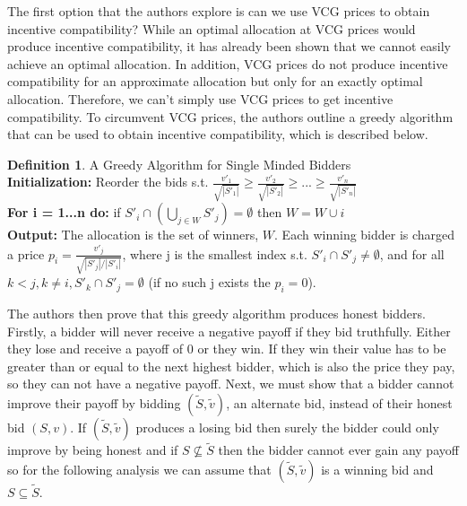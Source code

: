 \documentclass[10pt,onecolumn,letterpaper]{article}
\theoremstyle{definition}
\newtheorem{definition}{Definition}[section]
\begin{document}
The first option that the authors explore is can we use VCG prices to obtain incentive compatibility? While an optimal allocation at VCG prices would produce incentive compatibility, it has already been shown that we cannot easily achieve an optimal allocation. In addition, VCG prices do not produce incentive compatibility for an approximate allocation but only for an exactly optimal allocation. Therefore, we can't simply use VCG prices to get incentive compatibility. To circumvent VCG prices, the authors outline a greedy algorithm that can be used to obtain incentive compatibility, which is described below.

\theoremstyle{definition}
\begin{definition}{A Greedy Algorithm for Single Minded Bidders}
\\
\textbf{Initialization:} Reorder the bids s.t. $\frac{v'_1}{\sqrt{|S'_1|}} \geq \frac{v'_2}{\sqrt{|S'_2|}} \geq ... \geq \frac{v'_n}{\sqrt{|S'_n|}} $
\\
\textbf{For i = 1...n do:} if $S'_i \cap (\bigcup_{j \in W} S'_j) = \emptyset$ then $W = W \cup i$
\\
\textbf{Output:} The allocation is the set of winners, $W$. Each winning bidder is charged a price $p_i = \frac{v'_j}{\sqrt{|S'_j|/|S'_i|}}$, where j is the smallest index s.t. $S'_i \cap S'_j \neq \emptyset$, and for all $k < j, k \neq i, S'_k \cap S'_j = \emptyset$ (if no such j exists the $p_i = 0$).  
\end{definition}

The authors then prove that this greedy algorithm produces honest bidders. Firstly, a bidder will never receive a negative payoff if they bid truthfully. Either they lose and receive a payoff of 0 or they win. If they win their value has to be greater than or equal to the next highest bidder, which is also the price they pay, so they can not have a negative payoff. Next, we must show that a bidder cannot improve their payoff by bidding $(\tilde{S}, \tilde{v})$, an alternate bid, instead of their honest bid $(S,v)$. If $(\tilde{S}, \tilde{v})$ produces a losing bid then surely the bidder could only improve by being honest and if $S \nsubseteq \tilde{S}$ then the bidder cannot ever gain any payoff so for the following analysis we can assume that $(\tilde{S}, \tilde{v})$ is a winning bid and $S \subseteq \tilde{S}$.
\end{document}

